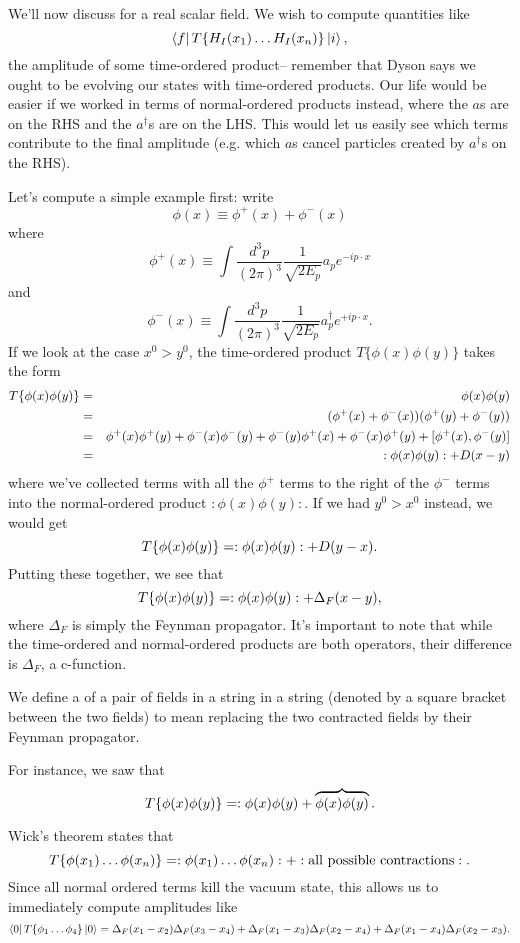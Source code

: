 We'll now discuss  for a real scalar field. We wish to compute quantities like
$$\left< f \right|T\{H_I(x_1)\ldots H_I(x_n)\}\left| i \right>,$$
the amplitude of some time-ordered product-- remember that Dyson says we ought to be evolving our states with time-ordered products. Our life would be easier if we worked in terms of normal-ordered products instead, where the $a$s are on the RHS and the $a^\dagger$s are on the LHS. This would let us easily see which terms contribute to the final amplitude (e.g. which $a$s cancel particles created by $a^\dagger$s on the RHS).

Let's compute a simple example first: write
$$\phi(x)\equiv \phi^+(x)+\phi^-(x)$$
where
$$\phi^+ (x)\equiv \int \frac{d^3p}{(2\pi)^3}\frac{1}{\sqrt{2E_p}} a_p e^{-ip\cdot x}$$
and
$$\phi^-(x)\equiv \int \frac{d^3p}{(2\pi)^3}\frac{1}{\sqrt{2E_p}} a_p^\dagger e^{+ip\cdot x}.$$
If we look at the case $x^0>y^0$, the time-ordered product $T\{\phi(x)\phi(y)\}$ takes the form
\begin{eqnarray*}
T\{\phi(x)\phi(y)\}&=&\phi(x)\phi(y)\\
&=&(\phi^+(x)+\phi^-(x))(\phi^+(y)+\phi^-(y))\\
&=&\phi^+(x)\phi^+(y)+\phi^-(x)\phi^-(y)+\phi^-(y)\phi^+(x)+\phi^-(x)\phi^+(y)+[\phi^+(x),\phi^-(y)]\\
&=&:\phi(x)\phi(y):+D(x-y)
\end{eqnarray*}
where we've collected terms with all the $\phi^+$ terms to the right of the $\phi^-$ terms into the normal-ordered product $:\phi(x)\phi(y):$. If we had $y^0>x^0$ instead, we would get
$$T\{\phi(x)\phi(y)\}=:\phi(x)\phi(y):+D(y-x).$$
Putting these together, we see that
$$T\{\phi(x)\phi(y)\}=:\phi(x)\phi(y):+\Delta_F(x-y),$$
where $\Delta_F$ is simply the Feynman propagator. It's important to note that while the time-ordered and normal-ordered products are both operators, their difference is $\Delta_F$, a c-function.

\begin{defn}
We define a  of a pair of fields in a string in a string (denoted by a square bracket between the two fields) to mean replacing the two contracted fields by their Feynman propagator.

For instance, we saw that
$$T\{\phi(x)\phi(y)\}=:\phi(x)\phi(y)+\overbrace{\phi(x)\phi(y)}.$$
\end{defn}

Wick's theorem states that
$$T\{\phi(x_1)\ldots \phi(x_n)\}=:\phi(x_1)\ldots \phi(x_n):+:\text{all possible contractions}:.$$
Since all normal ordered terms kill the vacuum state, this allows us to immediately compute amplitudes like
$$\left< 0 \right|T\{\phi_1\ldots \phi_4\}\left| 0 \right>=\Delta_F (x_1-x_2)\Delta_F(x_3-x_4)+\Delta_F(x_1-x_3)\Delta_F(x_2-x_4)+\Delta_F(x_1-x_4)\Delta_F(x_2-x_3).$$

